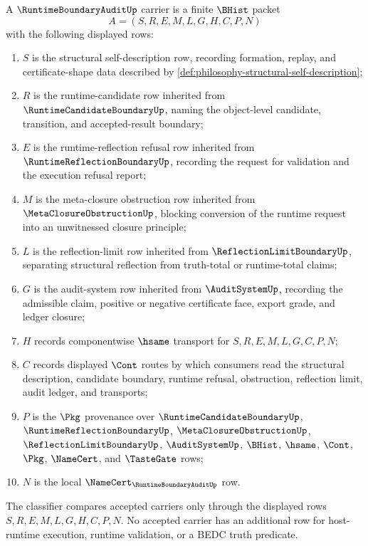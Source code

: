 \begin{definition}
\label{def:runtime-boundary-audit-carrier}
A $\RuntimeBoundaryAuditUp$ carrier is a finite $\BHist$ packet
$$
A=(S,R,E,M,L,G,H,C,P,N)
$$
with the following displayed rows:
\begin{enumerate}
\item $S$ is the structural self-description row, recording formation, replay, and certificate-shape data described by \autoref{def:philosophy-structural-self-description};
\item $R$ is the runtime-candidate row inherited from $\RuntimeCandidateBoundaryUp$, naming the object-level candidate, transition, and accepted-result boundary;
\item $E$ is the runtime-reflection refusal row inherited from $\RuntimeReflectionBoundaryUp$, recording the request for validation and the execution refusal report;
\item $M$ is the meta-closure obstruction row inherited from $\MetaClosureObstructionUp$, blocking conversion of the runtime request into an unwitnessed closure principle;
\item $L$ is the reflection-limit row inherited from $\ReflectionLimitBoundaryUp$, separating structural reflection from truth-total or runtime-total claims;
\item $G$ is the audit-system row inherited from $\AuditSystemUp$, recording the admissible claim, positive or negative certificate face, export grade, and ledger closure;
\item $H$ records componentwise $\hsame$ transport for $S,R,E,M,L,G,C,P,N$;
\item $C$ records displayed $\Cont$ routes by which consumers read the structural description, candidate boundary, runtime refusal, obstruction, reflection limit, audit ledger, and transports;
\item $P$ is the $\Pkg$ provenance over $\RuntimeCandidateBoundaryUp$, $\RuntimeReflectionBoundaryUp$, $\MetaClosureObstructionUp$, $\ReflectionLimitBoundaryUp$, $\AuditSystemUp$, $\BHist$, $\hsame$, $\Cont$, $\Pkg$, $\NameCert$, and $\TasteGate$ rows;
\item $N$ is the local $\NameCert_{\RuntimeBoundaryAuditUp}$ row.
\end{enumerate}
The classifier compares accepted carriers only through the displayed rows $S,R,E,M,L,G,H,C,P,N$. No accepted carrier has an additional row for host-runtime execution, runtime validation, or a BEDC truth predicate.
\end{definition}

